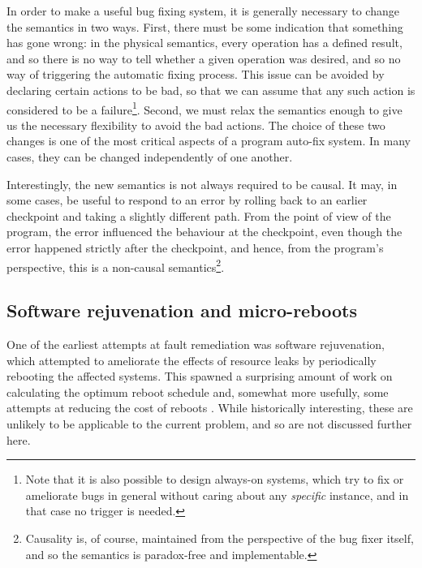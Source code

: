 In order to make a useful bug fixing system, it is generally necessary
to change the semantics in two ways.  First, there must be some
indication that something has gone wrong: in the physical semantics,
every operation has a defined result, and so there is no way to tell
whether a given operation was desired, and so no way of triggering the
automatic fixing process.  This issue can be avoided by declaring
certain actions to be bad, so that we can assume that any such action
is considered to be a failure\footnote{Note that it is also possible
  to design always-on systems, which try to fix or ameliorate bugs in
  general without caring about any \emph{specific} instance, and in
  that case no trigger is needed.  }.  Second, we must relax the semantics enough
to give us the necessary flexibility to avoid the bad actions.  The
choice of these two changes is one of the most critical aspects of a
program auto-fix system.  In many cases, they can be changed
independently of one another.

Interestingly, the new semantics is not always required to be causal.
It may, in some cases, be useful to respond to an error by rolling
back to an earlier checkpoint and taking a slightly different path.
From the point of view of the program, the error influenced the
behaviour at the checkpoint, even though the error happened strictly
after the checkpoint, and hence, from the program's perspective, this
is a non-causal semantics\footnote{Causality is, of course, maintained
  from the perspective of the bug fixer itself, and so the semantics
  is paradox-free and implementable.}.

\subsection{Software rejuvenation and micro-reboots}


One of the earliest attempts at fault remediation was software
rejuvenation\cite{Huang1995}, which attempted to ameliorate the
effects of resource leaks by periodically rebooting the affected
systems.  This spawned a surprising amount of work on calculating the
optimum reboot schedule
\cite{Li2002,Vaidyanathan1999,Vaidyanathan2001,Trivedi2000,Garg1998,Garg1995,Garg1998a,Castelli2001} and, somewhat more usefully, some attempts at reducing the
cost of reboots \cite{Candea2002,Candea2001,Candea,Patterson2002}.
While historically interesting, these are unlikely to be applicable to
the current problem, and so are not discussed further here.

